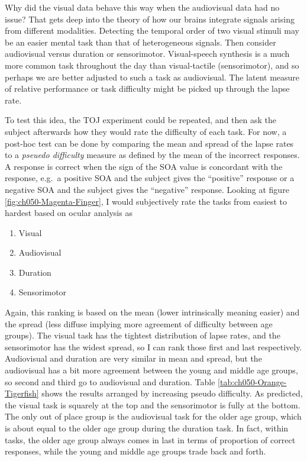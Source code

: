 \documentclass[11pt, oneside, openany]{scrbook}
\providecommand{\tightlist}{%
  \setlength{\itemsep}{0pt}\setlength{\parskip}{0pt}}
\begin{document}
Why did the visual data behave this way when the audiovisual data had no issue? That gets deep into the theory of how our brains integrate signals arising from different modalities. Detecting the temporal order of two visual stimuli may be an easier mental task than that of heterogeneous signals. Then consider audiovisual versus duration or sensorimotor. Visual-speech synthesis is a much more common task throughout the day than visual-tactile (sensorimotor), and so perhaps we are better adjusted to such a task as audiovisual. The latent measure of relative performance or task difficulty might be picked up through the lapse rate.

To test this idea, the TOJ experiment could be repeated, and then ask the subject afterwards how they would rate the difficulty of each task. For now, a post-hoc test can be done by comparing the mean and spread of the lapse rates to a \emph{pseuedo difficulty} measure as defined by the mean of the incorrect responses. A response is correct when the sign of the SOA value is concordant with the response, e.g.~a positive SOA and the subject gives the ``positive'' response or a negative SOA and the subject gives the ``negative'' response. Looking at figure \ref{fig:ch050-Magenta-Finger}, I would subjectively rate the tasks from easiest to hardest based on ocular analysis as

\begin{enumerate}
\def\labelenumi{\arabic{enumi}.}
\tightlist
\item
  Visual
\item
  Audiovisual
\item
  Duration
\item
  Sensorimotor
\end{enumerate}

Again, this ranking is based on the mean (lower intrinsically meaning easier) and the spread (less diffuse implying more agreement of difficulty between age groups). The visual task has the tightest distribution of lapse rates, and the sensorimotor has the widest spread, so I can rank those first and last respectively. Audiovisual and duration are very similar in mean and spread, but the audiovisual has a bit more agreement between the young and middle age groups, so second and third go to audiovisual and duration. Table \ref{tab:ch050-Orange-Tigerfish} shows the results arranged by increasing pseudo difficulty. As predicted, the visual task is squarely at the top and the sensorimotor is fully at the bottom. The only out of place group is the audiovisual task for the older age group, which is about equal to the older age group during the duration task. In fact, within tasks, the older age group always comes in last in terms of proportion of correct responses, while the young and middle age groups trade back and forth.
\end{document}
